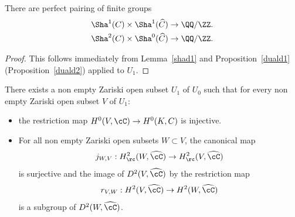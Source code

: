\begin{theo} \label{sha12theo}
There are perfect pairing of finite groups
\begin{align*}
\Sha^1(C) \times \Sha^1(\widehat C) &\to \QQ/\ZZ.
\\
\Sha^2(C) \times \Sha^0(\widehat C) &\to \QQ/\ZZ.
\end{align*}
\end{theo}

\begin{proof} This follows immediately from Lemma~\ref{shad1} and
Proposition~\ref{duald1} (\resp Pro\-po\-sition~\ref{duald2}) applied to $U_1$.
\end{proof}

\begin{lem} \label{injecth0}
There exists a non empty Zariski open subset $U_1$ of $U_0$ such that
for every non empty Zariski open subset $V$ of $U_1$:
\begin{itemize}
\item
the restriction map
$H^0(V,\cC) \to H^0(K,C)$ is injective.

\item
For all non empty Zariski open subsets $W \subset V$, the canonical map
\[
j_{W,V}: H^2_\rc(W,\widehat \cC) \to H^2_\rc(V,\widehat \cC)
\] is surjective and
the image of $D^2(V,\widehat \cC)$ by the restriction map
\[
r_{V,W}: H^2(V,\widehat \cC) \to H^2(W,\widehat \cC)
\] is a subgroup of
$D^2(W,\widehat \cC)$.
\end{itemize}
\end{lem}

